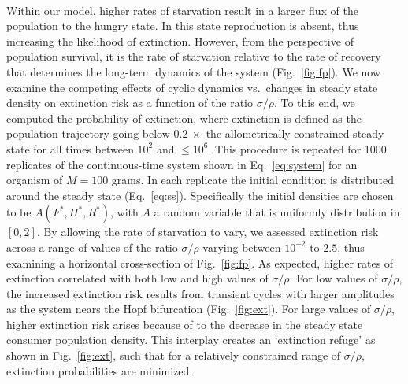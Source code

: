 \documentclass{pnastwo}
\begin{document}
\begin{article}

\\
Within our model, higher rates of starvation result in a larger flux of the
population to the hungry state.  In this state reproduction is absent, thus
increasing the likelihood of extinction.  However, from the perspective of
population survival, it is the rate of starvation relative to the rate of
recovery that determines the long-term dynamics of the system
(Fig.~\ref{fig:fp}).  We now examine the competing effects of cyclic dynamics
vs.\ changes in steady state density on extinction risk as a function of the
ratio $\sigma/\rho$.  To this end, we computed the probability of extinction,
where extinction is defined as the population trajectory going below
$0.2~\times$ the allometrically constrained steady state for all times
between $10^2$ and $\leq 10^6$.  This procedure is repeated for 1000
replicates of the continuous-time system shown in Eq.~\ref{eq:system} for an
organism of $M=100$ grams.  In each replicate the initial condition is
distributed around the steady state (Eq.~\ref{eq:ss}).  Specifically the
initial densities are chosen to be $A(F^*,H^*,R^*)$, with $A$ a random
variable that is uniformly distribution in $[0,2]$.  By allowing the rate of
starvation to vary, we assessed extinction risk across a range of values of
the ratio $\sigma/\rho$ varying between $10^{-2}$ to $2.5$, thus examining a
horizontal cross-section of Fig.~\ref{fig:fp}.  As expected, higher rates of
extinction correlated with both low and high values of $\sigma/\rho$.  For
low values of $\sigma/\rho$, the increased extinction risk results from
transient cycles with larger amplitudes as the system nears the Hopf
bifurcation (Fig.~\ref{fig:ext}).  For large values of $\sigma/\rho$, higher
extinction risk arises because of to the decrease in the steady state
consumer population density.  This interplay creates an `extinction refuge'
as shown in Fig.~\ref{fig:ext}, such that for a relatively constrained range
of $\sigma/\rho$, extinction probabilities are minimized.


\end{article}
\end{document}
